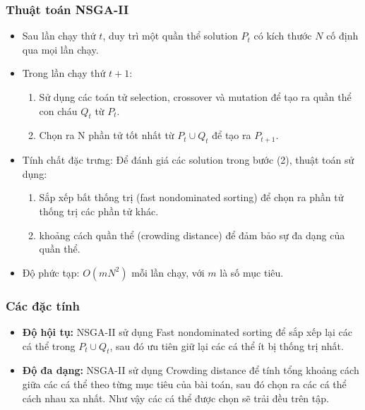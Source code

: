 \documentclass{beamer}
\begin{document}
    \begin{frame}
    \frametitle{\textbf{Thuật toán NSGA-II}}
        \begin{itemize}
            \item<1-> Sau lần chạy thứ $ t $, duy trì một quần thể solution $ P_t $ có kích thước $ N $ cố định qua mọi lần chạy.
            \item<2-> Trong lần chạy thứ $ t + 1 $:
            \begin{enumerate}
                \item<2-> Sử dụng các toán tử selection, crossover và mutation để tạo ra quần thể con cháu $ Q_t $ từ $ P_t $.
                \item<2-> Chọn ra N phần tử tốt nhất từ $ P_t \cup Q_t $ để tạo ra $ P_{t + 1} $.
            \end{enumerate}
            \item<3-> Tính chất đặc trưng: Để đánh giá các solution trong bước (2), thuật toán sử dụng:
            \begin{enumerate}
                \item<3-> Sắp xếp bất thống trị (fast nondominated sorting) để chọn ra phần tử thống trị các phần tử khác.
                \item<3-> khoảng cách quần thể (crowding distance) để đảm bảo sự đa dạng của quần thể.
            \end{enumerate}
            \item<4-> Độ phức tạp: $ O(mN^2) $ mỗi lần chạy, với $ m $ là số mục tiêu.
        \end{itemize}
    \end{frame}

    \begin{frame}
    \frametitle{\textbf{Các đặc tính}}
        \begin{itemize}
            \item<1-> \textbf{Độ hội tụ:} NSGA-II sử dụng Fast nondominated sorting để sắp xếp lại các 
            cá thể trong $ P_t \cup Q_t $, sau đó ưu tiên giữ lại các cá thể ít bị thống trị nhất.
            \item<2-> \textbf{Độ đa dạng:} NSGA-II sử dụng Crowding distance để tính tổng khoảng 
            cách giữa các cá thể theo từng mục tiêu của bài toán, sau đó chọn ra các cá thể cách nhau 
            xa nhất. Như vậy các cá thể được chọn sẽ trải đều trên tập.
        \end{itemize}
    \end{frame}
\end{document}
